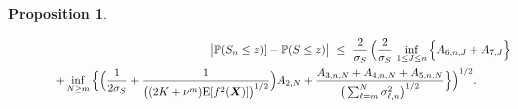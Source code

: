 \documentclass[10pt]{article}
\def\E{\mathrm E}
\newcommand{\mbf}[1]{\mbox{\boldmath $#1$}}
\newtheorem{prop}{Proposition}
\begin{document}
\begin{prop}
\begin{enumerate}
\begin{eqnarray}
\nonumber   && \hskip-0.7cm \big|\mathbb{P}(S_n\leq z) ] -\mathbb{P}(S\leq z)\big|\ \leq \ \frac 2 {\sigma_S} \,  \Big  ( \frac 2 {\sigma_S} \, \inf_{1\le J\le n}\Big \{ A_{6,n,J}+A_{7,J}\Big \}    \\
\label{mainestimate3} && \hspace{1.1cm} + \inf _{N\geq m} \Big   \{ \Big (\frac 1 {2 \sigma_S}
+ \frac 1 {\big(  (2K+\nu^m)\E[f^2({\mbf X})] \big )^{1/2}} \Big )  A_{2,N}
+    \frac{A_{3,n,N} + A_{4,n,N}+A_{5,n,N}}{\big ( \sum_{\ell=m}^N \sigma_{\ell,n}^2 \big )^{1/2}} \Big \}  \Big  )^{1/2}.\quad \qquad 
\end{eqnarray}
\end{enumerate}
\end{prop}
\end{document}
